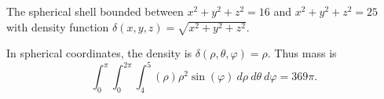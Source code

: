 {
The spherical shell bounded between $x^2+y^2+z^2=16$ and $x^2+y^2+z^2=25$ with density function $\delta(x,y,z) = \sqrt{x^2+y^2+z^2}$.
}
{In spherical coordinates, the density is $\delta(\rho,\theta,\varphi) = \rho$. Thus mass is
$$\int_0^{\pi}\int_0^{2\pi}\int_{4}^{5} (\rho)\rho^2\sin(\varphi)\ d\rho\ d\theta\ d\varphi = 369\pi.$$

}
